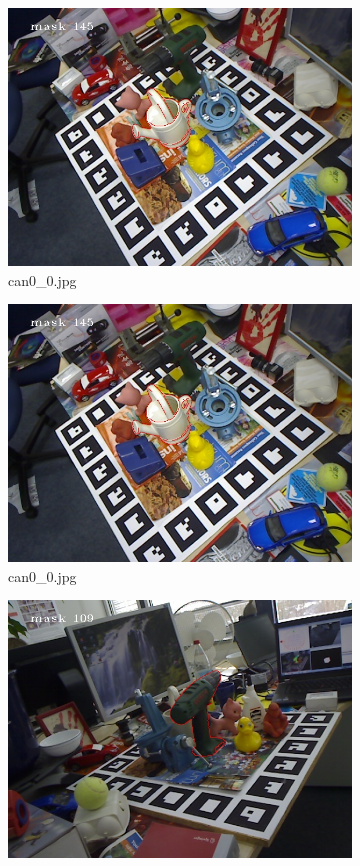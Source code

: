 \documentclass{article}
\begin{document}
\begin{figure}[H]
\begin{subfigure}{.5\textwidth}
  \centering
  \includegraphics[width=.9\linewidth]{Images/can_dist.jpg}
  \caption{can0\_0.jpg}
\end{subfigure}
\begin{subfigure}{.5\textwidth}
  \centering
  \includegraphics[width=.9\linewidth]{Images/can_refinement.jpg}  
  \caption{can0\_0.jpg}
\end{subfigure}
\newline
\begin{subfigure}{.5\textwidth}
  \centering
  \includegraphics[width=.9\linewidth]{Images/driller_dist.jpg}  

\end{subfigure}
\end{figure}
\end{document}
